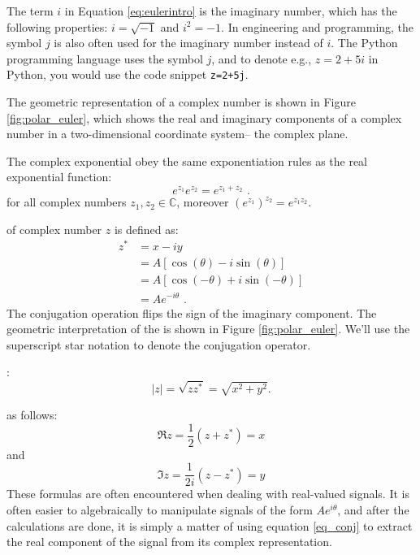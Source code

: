 The term $i$ in Equation \ref{eq:eulerintro} is the imaginary number, which has the following properties: $i=\sqrt{-1}$ and $i^2 = -1$. In engineering and programming, the symbol $j$ is also often used for the imaginary number instead of $i$. The Python programming language uses the symbol $j$, and to denote e.g., $z=2+5i$ in Python, you would use the code snippet \verb|z=2+5j|.   %

The geometric representation of a complex number is shown in
Figure \ref{fig:polar_euler}, which shows the real and imaginary
components of a complex number in a two-dimensional coordinate system-- the complex plane.

The complex exponential obey the same exponentiation rules as the real exponential function:
\begin{equation}
  \boxed{
  e^{z_{1}}e^{z_{2}} = e^{z_{1}+z_{2}}
  }\,\,.
  \label{eq:complexexponentiation}
\end{equation}
for all complex numbers $z_{1},z_{2}\in\mathbb{C}$, moreover $(e^{z_{1}})^{z_{2}}=e^{z_{1}z_{2}}$.

 of complex number $z$ is defined as:
\begin{align}
  z^* & = x - iy                         \\
      & =A[\cos(\theta)-i\sin(\theta)]   \\
      & =A[\cos(-\theta)+i\sin(-\theta)] \\
      & =A e^{-i\theta}\,\,.
\end{align}
The conjugation operation flips the sign of the imaginary
component. The geometric interpretation of the  is
shown in Figure \ref{fig:polar_euler}.  We'll use the superscript star notation to denote the conjugation operator.

:
\begin{equation}
\boxed{
|z| = \sqrt{z z^*} = \sqrt{x^2 + y^2}.
}
\end{equation}

 as follows:
\begin{equation}
\boxed{
  \Re{z}  = \frac{1}{2}(z+z^*)=x
  \label{eq_conj}
  }
\end{equation}
and 
  \begin{equation}
\boxed{
  \Im{z}  = \frac{1}{2i}(z-z^*)=y
  \label{eq_conj2}
  }
\end{equation}
These formulas are often encountered when dealing with real-valued signals. It is often easier to algebraically to manipulate signals of the form $Ae^{i\theta}$, and after the calculations are done, it is simply a matter of using equation \ref{eq_conj} to extract the real component of the signal from its complex representation. 

